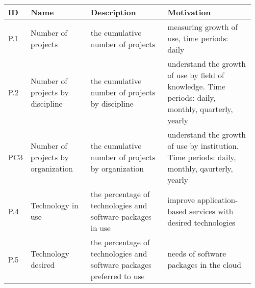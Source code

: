 \newcommand{\eTABLE}{\end{tabular}
\end{center}
\end{scriptsize}
\end{table*}}

\newcommand{\bTABLE}[2]{
\begin{table*}[htb]
\caption{#1}
\label{#2}
\bigskip
\begin{scriptsize}
\begin{center}
\begin{tabular}{lp{0.15\textwidth}p{0.3\textwidth}p{0.4\textwidth}}
\hline
\rowcolor{blue!20} \bf ID & \bf Name & \bf Description & \bf Motivation \\
\hline}

\newenvironment{METRICTABLE}[2] {\bTABLE{#1}{#2}}{\eTABLE}


\begin{METRICTABLE}{Project  management related metrics.}{T:project}
P.1 & Number of projects &  the cumulative number of projects &   measuring growth of use, time periods:  daily \\ \hline
P.2 & Number of projects by discipline &  the cumulative number of projects by discipline & understand the growth of use by field of knowledge. Time periods: daily, monthly, quarterly, yearly \\ \hline
PC3 & Number of projects by organization &  the cumulative number of projects by organization & understand the growth of use by institution. Time periods: daily, monthly, qaurterly, yearly \\ \hline
P.4 & Technology in use   &  the percentage of technologies and software packages in use &  improve application-based services with desired technologies \\ \hline
P.5 & Technology desired &  the percentage of technologies and software packages preferred to use & needs of software packages in the cloud \\ \hline
\end{METRICTABLE}

